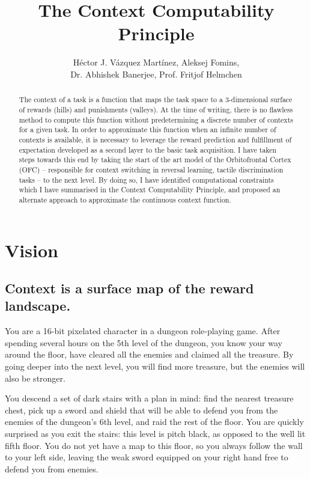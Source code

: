 \documentclass[]{article}
\title{The Context Computability Principle}
\author{H\'ector J. V\'azquez Mart\'inez, Aleksej Fomins,\\
	 Dr. Abhishek Banerjee, Prof. Fritjof Helmchen}
\begin{document}
\maketitle

\begin{abstract}
The context of a task is a function that maps the task space to a 3-dimensional surface of rewards (hills) and punishments (valleys).  At the time of writing, there is no flawless method to compute this function without predetermining a discrete number of contexts for a given task.  In order to approximate this function when an infinite number of contexts is available, it is necessary to leverage the reward prediction and fulfillment of expectation developed as a second layer to the basic task acquisition.  I have taken steps towards this end by taking the start of the art model of the Orbitofrontal Cortex (OFC) -- responsible for context switching in reversal learning, tactile discrimination tasks -- to the next level.  By doing so, I have identified computational constraints which I have summarised in the Context Computability Principle, and proposed an alternate approach to approximate the continuous context function.
\end{abstract}


\section{Vision}


\subsection{Context is a surface map of the reward landscape.}
You are a 16-bit pixelated character in a dungeon role-playing game.  After spending several hours on the 5th level of the dungeon, you know your way around the floor, have cleared all the enemies and claimed all the treasure.  By going deeper into the next level, you will find more treasure, but the enemies will also be stronger.

You descend a set of dark stairs with a plan in mind: find the nearest treasure chest, pick up a sword and shield that will be able to defend you from the enemies of the dungeon's 6th level, and raid the rest of the floor.  You are quickly surprised as you exit the stairs: this level is pitch black, as opposed to the well lit fifth floor.  You do not yet have a map to this floor, so you always follow the wall to your left side, leaving the weak sword equipped on your right hand free to defend you from enemies.
\end{document}
